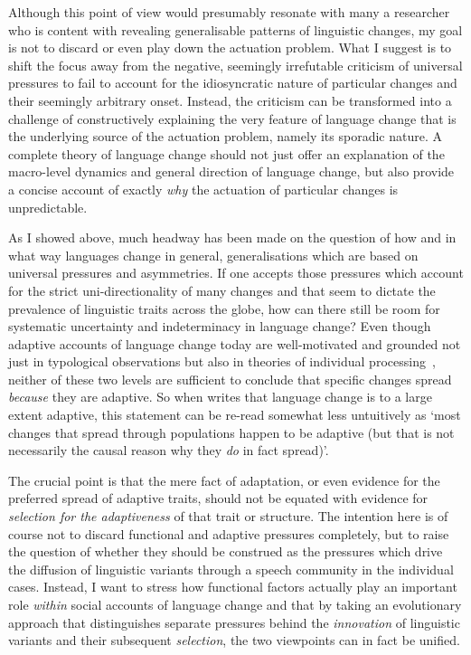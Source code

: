 Although this point of view would presumably resonate with many a researcher who is content with revealing generalisable patterns of linguistic changes, my goal is not to discard or even play down the actuation problem. 
What I suggest is to shift the focus away from the negative, seemingly irrefutable criticism of universal pressures to fail to account for the idiosyncratic nature of particular changes and their seemingly arbitrary onset. Instead, the criticism can be transformed into a challenge of constructively explaining the very feature of language change that is the underlying source of the actuation problem, namely its sporadic nature.
A complete theory of language change should not just offer an explanation of the macro-level dynamics and general direction of language change, but also provide a concise account of exactly \emph{why} the actuation of particular changes is unpredictable. %

As I showed above, much headway has been made on the question of how and in what way languages change in general, generalisations which are based on universal pressures and asymmetries. If one accepts those pressures which account for the strict uni-directionality of many changes and that seem to dictate the prevalence of linguistic traits across the globe, how can there still be room for systematic uncertainty and indeterminacy in language change?
Even though adaptive accounts of language change today are well-motivated and grounded not just in typological observations but also in theories of individual processing~\citep{Kirby1999,Jaeger2010}, neither of these two levels are sufficient to conclude that specific changes spread \emph{because} they are adaptive. So when \citet{Wichmann2015} writes that language change is to a large extent adaptive, this statement can be re-read somewhat less untuitively as `most changes that spread through populations happen to be adaptive (but that is not necessarily the causal reason why they \emph{do} in fact spread)'.

The crucial point is that the mere fact of adaptation, or even evidence for the preferred spread of adaptive traits, should not be equated with evidence for \emph{selection for the adaptiveness} of that trait or structure. %
The intention here is of course not to discard functional and adaptive pressures completely, but to raise the question of whether they should be construed as the pressures which drive the diffusion of linguistic variants through a speech community in the individual cases.
Instead, I want to stress how functional factors actually play an important role \emph{within} social accounts of language change and that by taking an evolutionary approach that distinguishes separate pressures behind the \emph{innovation} of linguistic variants and their subsequent \emph{selection}, the two viewpoints can in fact be unified.

